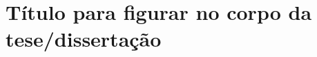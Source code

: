 \chapter[Título para o Índice]{Título para figurar no corpo da tese/dissertação}
\label{Ch:CapExemplo}



